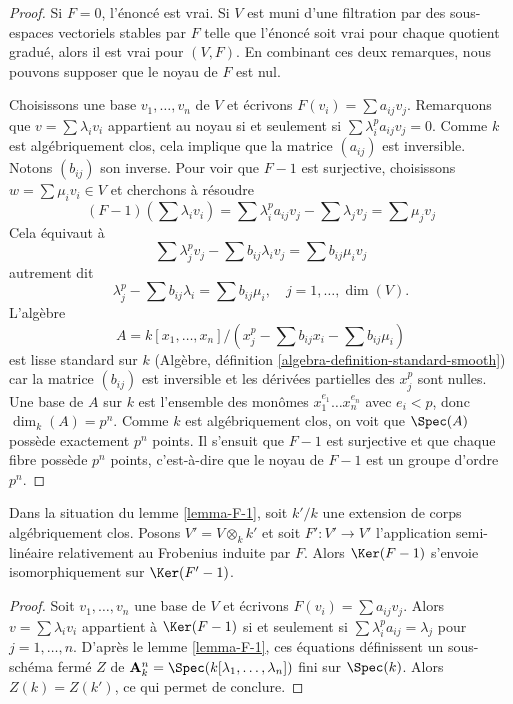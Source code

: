 \begin{proof}
Si $F = 0$, l'\'enonc\'e est vrai. Si $V$ est muni d'une filtration par des
sous-espaces vectoriels stables par $F$ telle que l'\'enonc\'e soit vrai pour chaque
quotient gradu\'e, alors il est vrai pour $(V, F)$. En combinant ces deux remarques,
nous pouvons supposer que le noyau de $F$ est nul.

\medskip\noindent
Choisissons une base $v_1, \ldots, v_n$ de $V$ et \'ecrivons
$F(v_i) = \sum a_{ij} v_j$. Remarquons que $v = \sum \lambda_i v_i$
appartient au noyau si et seulement si $\sum \lambda_i^p a_{ij} v_j = 0$.
Comme $k$ est alg\'ebriquement clos, cela implique que la matrice $(a_{ij})$
est inversible. Notons $(b_{ij})$ son inverse. Pour voir que $F - 1$
est surjective, choisissons $w = \sum \mu_i v_i \in V$ et cherchons \`a r\'esoudre
$$
(F - 1)(\sum \lambda_iv_i) =
\sum \lambda_i^p a_{ij} v_j - \sum \lambda_j v_j = \sum \mu_j v_j
$$
Cela \'equivaut \`a
$$
\sum \lambda_j^p v_j - \sum b_{ij} \lambda_i v_j = \sum b_{ij} \mu_i v_j
$$
autrement dit
$$
\lambda_j^p - \sum b_{ij} \lambda_i = \sum b_{ij} \mu_i,
\quad j = 1, \ldots, \dim(V).
$$
L'alg\`ebre
$$
A = k[x_1, \ldots, x_n]/
(x_j^p - \sum b_{ij} x_i - \sum b_{ij} \mu_i)
$$
est lisse standard sur $k$
(Algèbre, définition \ref{algebra-definition-standard-smooth})
car la matrice $(b_{ij})$ est inversible et les d\'eriv\'ees partielles
des $x_j^p$ sont nulles. Une base de $A$ sur $k$ est l'ensemble des mon\^omes
$x_1^{e_1} \ldots x_n^{e_n}$ avec $e_i < p$, donc $\dim_k(A) = p^n$.
Comme $k$ est alg\'ebriquement clos, on voit que $\Spec(A)$ poss\`ede exactement
$p^n$ points. Il s'ensuit que $F - 1$ est surjective et que chaque fibre
poss\`ede $p^n$ points, c'est-\`a-dire que le noyau de $F - 1$ est un groupe d'ordre $p^n$.
\end{proof}

\begin{lemma}
\label{lemma-F-2}
Dans la situation du lemme \ref{lemma-F-1}, soit $k'/k$ une extension
de corps alg\'ebriquement clos. Posons $V' = V \otimes_k k'$ et soit
$F' : V' \to V'$ l'application semi-lin\'eaire relativement au Frobenius induite par $F$.
Alors $\Ker(F - 1)$ s'envoie isomorphiquement sur $\Ker(F' - 1)$.
\end{lemma}

\begin{proof}
Soit $v_1, \ldots, v_n$ une base de $V$ et \'ecrivons $F(v_i) = \sum a_{ij}v_j$.
Alors $v = \sum \lambda_i v_i$ appartient \`a $\Ker(F - 1)$ si et seulement si
$\sum \lambda_i^pa_{ij} = \lambda_j$ pour $j = 1, \ldots, n$.
D'apr\`es le lemme \ref{lemma-F-1}, ces \'equations
d\'efinissent un sous-sch\'ema ferm\'e $Z$ de
$\mathbf{A}^n_k = \Spec(k[\lambda_1, \ldots, \lambda_n])$
fini sur $\Spec(k)$. Alors $Z(k) = Z(k')$, ce qui permet de conclure.
\end{proof}

